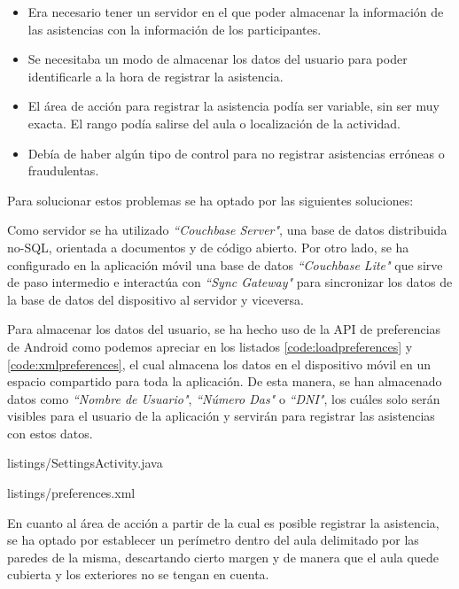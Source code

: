 \begin{itemize}
\item Era necesario tener un servidor en el que poder almacenar la información de las asistencias con la información de los participantes.
\item Se necesitaba un modo de almacenar los datos del usuario para poder identificarle a la hora de registrar la asistencia.
\item El área de acción para registrar la asistencia podía ser variable, sin ser muy exacta. El rango podía salirse del aula o localización de la actividad.
\item Debía de haber algún tipo de control para no registrar asistencias erróneas o fraudulentas.
\end{itemize}

Para solucionar estos problemas se ha optado por las siguientes soluciones: 

Como servidor se ha utilizado \textit{``Couchbase Server"}, una base de datos distribuida no-SQL, orientada a documentos y de código abierto. Por otro lado, se ha configurado en la aplicación móvil una base de datos \textit{``Couchbase Lite"} que sirve de paso intermedio e interactúa con \textit{``Sync Gateway"} para sincronizar los datos de la base de datos del dispositivo al servidor y viceversa.


Para almacenar los datos del usuario, se ha hecho uso de la API de preferencias de Android como podemos apreciar en los listados \ref{code:loadpreferences} y \ref{code:xmlpreferences}, el cual almacena los datos en el dispositivo móvil en un espacio compartido para toda la aplicación. De esta manera, se han almacenado datos como \textit{``Nombre de Usuario"}, \textit{``Número Das"} o \textit{``DNI"}, los cuáles solo serán visibles para el usuario de la aplicación y servirán para registrar las asistencias con estos datos.


{listings/SettingsActivity.java} %


{listings/preferences.xml} %

En cuanto al área de acción a partir de la cual es posible registrar la asistencia, se ha optado por establecer un perímetro dentro del aula delimitado por las paredes de la misma, descartando cierto margen y de manera que el aula quede cubierta y los exteriores no se tengan en cuenta. 

